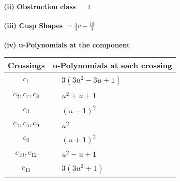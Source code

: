 \documentclass[1p]{elsarticle_modified}
\theoremstyle{definition}
\begin{document}
\flushleft \textbf{(ii) Obstruction class $= 1$}\\~\\
\flushleft \textbf{(iii) Cusp Shapes $= \frac{4}{3} v-\frac{10}{3}$}\\~\\
\newpage\renewcommand{\arraystretch}{1}
\flushleft \textbf{(iv) u-Polynomials at the component}\newline \\
\begin{tabular}{m{50pt}|m{274pt}}
Crossings & \hspace{64pt}u-Polynomials at each crossing \\
\hline $$\begin{aligned}c_{1}\end{aligned}$$&$\begin{aligned}
&3(3 u^2-3 u+1)
\end{aligned}$\\
\hline $$\begin{aligned}c_{2},c_{7},c_{8}\end{aligned}$$&$\begin{aligned}
&u^2+u+1
\end{aligned}$\\
\hline $$\begin{aligned}c_{3}\end{aligned}$$&$\begin{aligned}
&(u-1)^2
\end{aligned}$\\
\hline $$\begin{aligned}c_{4},c_{5},c_{9}\end{aligned}$$&$\begin{aligned}
&u^2
\end{aligned}$\\
\hline $$\begin{aligned}c_{6}\end{aligned}$$&$\begin{aligned}
&(u+1)^2
\end{aligned}$\\
\hline $$\begin{aligned}c_{10},c_{12}\end{aligned}$$&$\begin{aligned}
&u^2- u+1
\end{aligned}$\\
\hline $$\begin{aligned}c_{11}\end{aligned}$$&$\begin{aligned}
&3(3 u^2+1)
\end{aligned}$\\
\hline
\end{tabular}\\~\\
\end{document}
